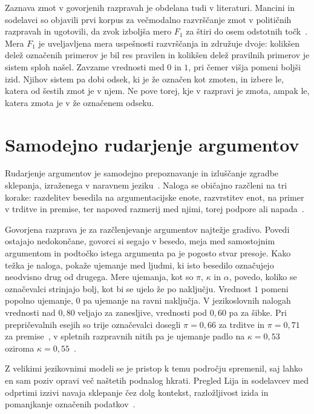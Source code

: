 \documentclass[a4paper, 12pt]{book}
\begin{document}
Zaznava zmot v govorjenih razpravah je obdelana tudi v literaturi. Mancini in
sodelavci so objavili prvi korpus za večmodalno razvrščanje zmot v političnih
razpravah in ugotovili, da zvok izboljša mero $F_1$ za štiri do osem odstotnih
točk~\cite{mancini2024fallacy}. Mera $F_1$ je uveljavljena mera uspešnosti
razvrščanja in združuje dvoje: kolikšen delež označenih primerov je bil res
pravilen in kolikšen delež pravilnih primerov je sistem sploh našel. Zavzame
vrednosti med $0$ in $1$, pri čemer višja pomeni boljši izid. Njihov sistem pa
dobi odsek, ki je že označen kot zmoten, in izbere le, katera od šestih zmot je
v njem. Ne pove torej, kje v razpravi je zmota, ampak le, katera zmota je v že
označenem odseku.


\section{Samodejno rudarjenje argumentov}
\label{sec:argument-mining}

Rudarjenje argumentov je samodejno prepoznavanje in izluščanje zgradbe
sklepanja, izraženega v naravnem jeziku~\cite{lawrence2019argument}. Naloga se običajno razčleni na tri korake: razdelitev besedila na argumentacijske enote, razvrstitev enot, na primer v trditve in premise, ter napoved razmerij med njimi, torej podpore ali napada~\cite{stede2018}.

Govorjena razprava je za razčlenjevanje argumentov najtežje gradivo. Povedi
ostajajo nedokončane, govorci si segajo v besedo, meja med samostojnim
argumentom in podtočko istega argumenta pa je pogosto stvar presoje. Kako težka
je naloga, pokaže ujemanje med ljudmi, ki isto besedilo označujejo neodvisno
drug od drugega. Mere ujemanja, kot so $\pi$, $\kappa$ in $\alpha$, povedo,
koliko se označevalci strinjajo bolj, kot bi se ujelo že po
naključju. Vrednost $1$ pomeni popolno ujemanje, $0$ pa ujemanje na ravni
naključja. V jezikoslovnih nalogah vrednosti nad $0{,}80$ veljajo za zanesljive,
vrednosti pod $0{,}60$ pa za šibke. Pri prepričevalnih esejih so trije
označevalci dosegli $\pi = 0{,}66$ za trditve in $\pi = 0{,}71$ za
premise~\cite{stab2014}, v spletnih razpravnih nitih pa je ujemanje padlo na
$\kappa = 0{,}53$ oziroma $\kappa = 0{,}55$~\cite{collagree2018}. 

Z velikimi jezikovnimi modeli se je pristop k temu področju spremenil, saj lahko
en sam poziv opravi več naštetih podnalog hkrati. Pregled Lija in sodelavcev med
odprtimi izzivi navaja sklepanje čez dolg kontekst, razložljivost izida in
pomanjkanje označenih podatkov~\cite{li2025llmargmining}.
\end{document}
